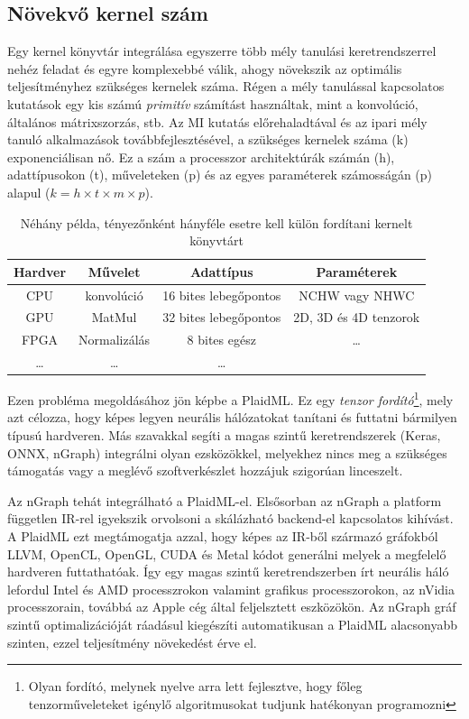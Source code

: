 \subsection{Növekvő kernel szám}
Egy kernel könyvtár integrálása egyszerre több mély tanulási keretrendszerrel nehéz feladat és egyre komplexebbé válik, ahogy növekszik az optimális teljesítményhez szükséges kernelek száma.
Régen a mély tanulással kapcsolatos kutatások egy kis számú \emph{primitív} számítást használtak, mint a konvolúció, általános mátrixszorzás, stb. Az MI kutatás előrehaladtával és az ipari mély tanuló alkalmazások továbbfejlesztésével, a szükséges kernelek száma (k) exponenciálisan nő.
Ez a szám a processzor architektúrák számán (h), adattípusokon (t), műveleteken (p) és az egyes paraméterek számosságán (p) alapul ($ k = h \times t \times m \times p $).
\begin{table}[!ht]
	\centering
	\begin{tabular}{|c|c|c|c|}
		
		Hardver & Művelet & Adattípus & Paraméterek \\ 
		\hline
		CPU & konvolúció & 16 bites lebegőpontos & NCHW vagy NHWC \\ 
		
		GPU & MatMul & 32 bites lebegőpontos & 2D, 3D és 4D tenzorok \\ 
		
		FPGA & Normalizálás & 8 bites egész &  \dots \\ 
		
		\dots & \dots & \dots & \\
	\end{tabular} 
	\caption{Néhány példa, tényezőnként hányféle esetre kell külön fordítani  kernelt könyvtárt }
	\label{table:kernels}
\end{table}

Ezen probléma megoldásához jön képbe a PlaidML. Ez egy \emph{tenzor fordító}\footnote{Olyan fordító, melynek nyelve arra lett fejlesztve, hogy főleg tenzorműveleteket igénylő algoritmusokat tudjunk hatékonyan programozni\cite{wiki:plaidml}}, mely azt célozza, hogy képes legyen neurális hálózatokat tanítani és futtatni bármilyen típusú hardveren. Más szavakkal segíti a magas szintű keretrendszerek (Keras, ONNX, nGraph) integrálni olyan ezsközökkel, melyekhez nincs meg a szükséges támogatás vagy a meglévő szoftverkészlet hozzájuk szigorúan linceszelt.\cite{web:PlaidML}\cite{github:PlaidML}

Az nGraph tehát integrálható a PlaidML-el. Elsősorban az nGraph a platform független IR-rel igyekszik orvolsoni a skálázható backend-el kapcsolatos kihívást. A PlaidML ezt megtámogatja azzal, hogy képes az IR-ből származó gráfokból LLVM, OpenCL, OpenGL, CUDA és Metal kódot generálni melyek a megfelelő hardveren futtathatóak. Így egy magas szintű keretrendszerben írt neurális háló lefordul Intel és AMD processzrokon valamint grafikus processzorokon, az nVidia processzorain, továbbá az Apple cég által feljelsztett eszközökön. Az nGraph gráf szintű optimalizációját ráadásul kiegészíti automatikusan a PlaidML alacsonyabb szinten, ezzel teljesítmény növekedést érve el.


